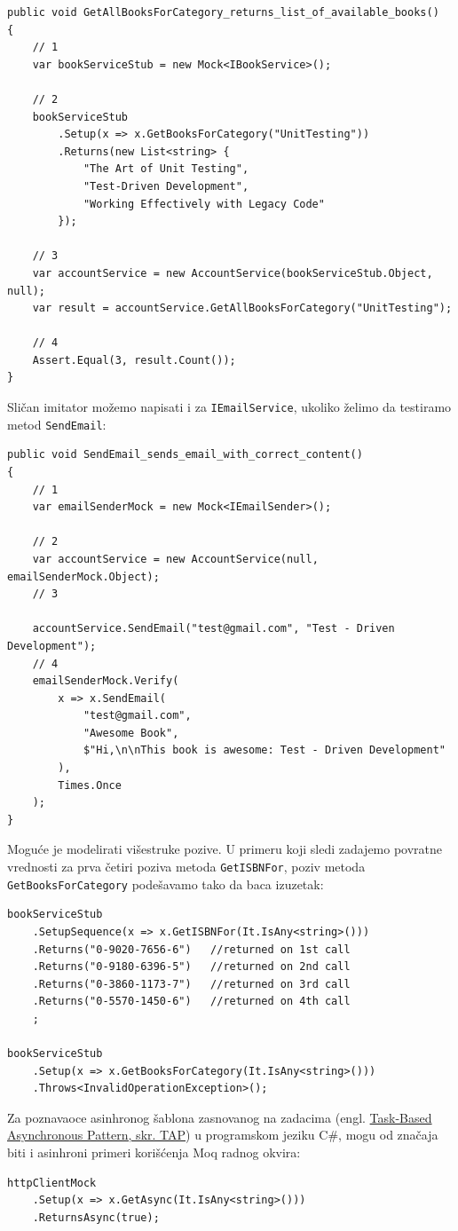 \begin{verbatim}
public void GetAllBooksForCategory_returns_list_of_available_books()
{
    // 1
    var bookServiceStub = new Mock<IBookService>();

    // 2
    bookServiceStub
        .Setup(x => x.GetBooksForCategory("UnitTesting"))
        .Returns(new List<string> {
            "The Art of Unit Testing",
            "Test-Driven Development",
            "Working Effectively with Legacy Code"
        });

    // 3
    var accountService = new AccountService(bookServiceStub.Object, null);
    var result = accountService.GetAllBooksForCategory("UnitTesting");

    // 4
    Assert.Equal(3, result.Count());
}
\end{verbatim}

Sličan imitator možemo napisati i za \texttt{IEmailService}, ukoliko želimo da testiramo metod \texttt{SendEmail}:

\begin{verbatim}
public void SendEmail_sends_email_with_correct_content()
{
    // 1
    var emailSenderMock = new Mock<IEmailSender>();

    // 2
    var accountService = new AccountService(null, emailSenderMock.Object);
    // 3

    accountService.SendEmail("test@gmail.com", "Test - Driven Development");
    // 4
    emailSenderMock.Verify(
        x => x.SendEmail(
            "test@gmail.com",
            "Awesome Book",
            $"Hi,\n\nThis book is awesome: Test - Driven Development"
        ),
        Times.Once
    );
}
\end{verbatim}

Moguće je modelirati višestruke pozive. U primeru koji sledi zadajemo povratne vrednosti za prva četiri poziva metoda \texttt{GetISBNFor}, poziv metoda \texttt{GetBooksForCategory} podešavamo tako da baca izuzetak:

\begin{verbatim}
bookServiceStub
    .SetupSequence(x => x.GetISBNFor(It.IsAny<string>()))
    .Returns("0-9020-7656-6")   //returned on 1st call
    .Returns("0-9180-6396-5")   //returned on 2nd call
    .Returns("0-3860-1173-7")   //returned on 3rd call
    .Returns("0-5570-1450-6")   //returned on 4th call
    ;

bookServiceStub
    .Setup(x => x.GetBooksForCategory(It.IsAny<string>()))
    .Throws<InvalidOperationException>();
\end{verbatim}

Za poznavaoce asinhronog šablona zasnovanog na zadacima (engl. \href{https://learn.microsoft.com/en-us/dotnet/standard/asynchronous-programming-patterns/task-based-asynchronous-pattern-tap}{Task-Based Asynchronous Pattern, skr. TAP}) u programskom jeziku C\#, mogu od značaja biti i asinhroni primeri korišćenja Moq radnog okvira:

\begin{verbatim}
httpClientMock
    .Setup(x => x.GetAsync(It.IsAny<string>()))
    .ReturnsAsync(true);
\end{verbatim}
